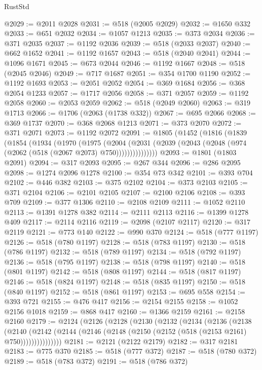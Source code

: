 \begin{lexlean}{RustStd}
\begin{coremodule}
@2029 := @2011 @2028
@2031 := @518 (@2005 @2029)
@2032 := @1650 @332
@2033 := @651 @2032
@2034 := @1057 @1213
@2035 := @373 @2034
@2036 := @371 @2035
@2037 := @1192 @2036
@2039 := @518 (@2033 @2037)
@2040 := @662 @1652
@2041 := @1192 @1657
@2043 := @518 (@2040 @2041)
@2044 := @1096 @1671
@2045 := @673 @2044
@2046 := @1192 @1667
@2048 := @518 (@2045 @2046)
@2049 := @717 @1687
@2051 := @354 @1700 @1190
@2052 := @1192 @1693
@2053 := @2051 @2052
@2054 := @369 @1684
@2056 := @368 @2054 @1233
@2057 := @1717 @2056
@2058 := @371 @2057
@2059 := @1192 @2058
@2060 := @2053 @2059
@2062 := @518 (@2049 @2060)
@2063 := @319 @1713
@2066 := @1706 (@2063 (@1738 @332))
@2067 := @695 @2066
@2068 := @369 @1737
@2070 := @368 @2068 @1213
@2071 := @373 @2070
@2072 := @371 @2071
@2073 := @1192 @2072
@2091 := @1805
    (@1452
      (@1816
        (@1839
          (@1854
            (@1934
              (@1970
                (@1975
                  (@2004
                    (@2031 (@2039 (@2043 (@2048 (@974 (@2062 (@518 (@2067 @2073) @750)))))))))))))))
@2093 := @1801 (@1803 @2091)
@2094 := @317 @2093
@2095 := @267 @344
@2096 := @286 @2095
@2098 := @1274 @2096 @1278
@2100 := @354 @73 @342
@2101 := @393 @704
@2102 := @446 @382
@2103 := @375 @2102
@2104 := @373 @2103
@2105 := @371 @2104
@2106 := @2101 @2105
@2107 := @2100 @2106
@2108 := @393 @709
@2109 := @377 @1306
@2110 := @2108 @2109
@2111 := @1052 @2110
@2113 := @1391 @1278 @382
@2114 := @2111 @2113
@2116 := @1399 @1278 @409
@2117 := @2114 @2116
@2119 := @2098 (@2107 @2117)
@2120 := @317 @2119
@2121 := @773 @140
@2122 := @990 @370
@2124 := @518 (@777 @1197)
@2126 := @518 (@780 @1197)
@2128 := @518 (@783 @1197)
@2130 := @518 (@786 @1197)
@2132 := @518 (@789 @1197)
@2134 := @518 (@792 @1197)
@2136 := @518 (@795 @1197)
@2138 := @518 (@798 @1197)
@2140 := @518 (@801 @1197)
@2142 := @518 (@808 @1197)
@2144 := @518 (@817 @1197)
@2146 := @518 (@824 @1197)
@2148 := @518 (@835 @1197)
@2150 := @518 (@840 @1197)
@2152 := @518 (@861 @1197)
@2153 := @695 @558
@2154 := @393 @721
@2155 := @476 @417
@2156 := @2154 @2155
@2158 := @1052 @2156 @1018
@2159 := @868 @417
@2160 := @1366 @2159
@2161 := @2158 @2160
@2179 := @2124
    (@2126
      (@2128
        (@2130
          (@2132
            (@2134
              (@2136
                (@2138
                  (@2140
                    (@2142
                      (@2144 (@2146 (@2148 (@2150 (@2152 (@518 (@2153 @2161) @750)))))))))))))))
@2181 := @2121 (@2122 @2179)
@2182 := @317 @2181
@2183 := @775 @370
@2185 := @518 (@777 @372)
@2187 := @518 (@780 @372)
@2189 := @518 (@783 @372)
@2191 := @518 (@786 @372)

\end{coremodule}
\end{lexlean}
